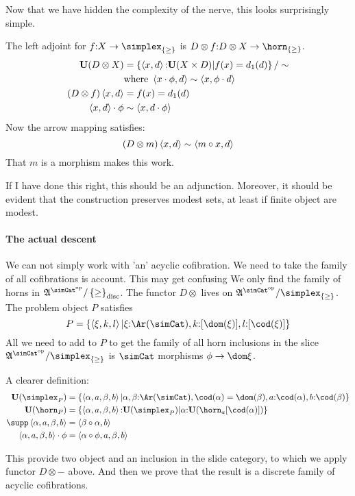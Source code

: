 \documentclass[csh.tex]{subfiles}
\begin{document}
Now that we have hidden the complexity of the nerve, this looks surprisingly simple.

The left adjoint for $f\of X\to \simplex_{\set\geq}$ is $D\otimes f \of D\otimes X \to \horn_{\set\geq}$.
\begin{align*}
\mathbf{U}(D\otimes X) &= \left\{\left\langle x,d \right\rangle\mathord : \mathbf{U}(X\times D)|f(x)=d_1(d)\right\}/\sim\\
& \textrm{where }\left\langle x\cdot\phi,d \right\rangle\sim\left\langle x,\phi\cdot d \right\rangle\\
(D\otimes f)\left\langle x,d \right\rangle &= f(x)=d_1(d)\\
\left\langle x,d \right\rangle\cdot\phi &\sim \left\langle x,d\cdot \phi \right\rangle
\end{align*}
Now the arrow mapping satisfies:
\[ (D\otimes m)\left\langle x,d \right\rangle \sim \left\langle m\circ x,d \right\rangle \]
That $m$ is a morphism makes this work.


If I have done this right, this should be an adjunction. Moreover, it should be evident that the construction preserves modest sets, at least if finite object are modest.

\paragraph{The actual descent}
We can not simply work with 'an' acyclic cofibration. We need to take the family of all cofibrations is account. This may get confusing
We only find the family of horns in $\ambient\s/\set\geq\disc$. The functor $D\otimes$ lives on $\ambient\s/\simplex_{\set\geq}$. 
The problem object $P$ satisfies \[P = \set{\tuplet{\xi,k,l}|\xi\of\Ar(\simCat),k\of[\dom(\xi)],l\of[\cod(\xi)] }\] 
All we need to add to $P$ to get the family of all horn inclusions in the slice $\ambient\s/\simplex_{\set\geq}$ is $\simCat$ morphisms $\phi\to \dom\xi$.

A clearer definition:
\begin{align*}
\base(\simplex_P) &= \set{\tuplet{\alpha,a,\beta,b}| 
\alpha,\beta\of\Ar(\simCat),\cod(\alpha)=\dom(\beta),
a\of\cod(\alpha),b\of\cod(\beta)}\\
\base(\horn_P) &= \set{\tuplet{\alpha,a,\beta,b}\of \base(\simplex_P)|\alpha\of\base(\horn_a[\cod(\alpha)])}\\
\supp\tuplet{\alpha,a,\beta,b} &= \tuplet{\beta\circ \alpha,b}\\
\tuplet{\alpha,a,\beta,b}\cdot\phi &= \tuplet{\alpha\circ \phi,a,\beta,b}
\end{align*}

This provide two object and an inclusion in the slide category, to which we apply functor $D\otimes-$ above. And then we prove that the result is a discrete family of acyclic cofibrations.
\end{document}
